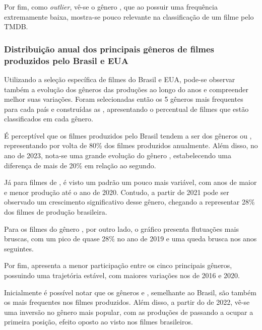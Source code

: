 Por fim, como \textit{outlier}, vê-se o gênero , que ao possuir uma frequência extremamente baixa, mostra-se pouco relevante na classificação de um filme pelo \acrshort{TMDB}.


\subsubsection{Distribuição anual dos principais gêneros de filmes produzidos pelo Brasil e EUA}
Utilizando a seleção específica de filmes do Brasil e EUA, pode-se observar também a evolução dos gêneros das produções ao longo do anos e compreender melhor suas variações. Foram selecionadas então os 5 gêneros mais frequentes para cada país e construídas as , apresentando o percentual de filmes que estão classificados em cada gênero.

%

É perceptível que os filmes produzidos pelo Brasil tendem a ser dos gêneros  ou , representando por volta de 80\% dos filmes produzidos anualmente. Além disso, no ano de 2023, nota-se uma grande evolução do gênero , estabelecendo uma diferença de mais de 20\% em relação ao segundo.

Já para filmes de , é visto um padrão um pouco mais variável, com anos de maior e menor produção até o ano de 2020. Contudo, a partir de 2021 pode ser observado um crescimento significativo desse gênero, chegando a representar 28\% dos filmes de produção brasileira.

Para os filmes do gênero , por outro lado, o gráfico presenta flutuações mais bruscas, com um pico de quase 28\% no ano de 2019 e uma queda brusca nos anos seguintes.

Por fim,  apresenta a menor participação entre os cinco principais gêneros, possuindo uma trajetória estável, com maiores variações nos de 2016 e 2020.

%

Inicialmente é possível notar que os gêneros  e , semelhante ao Brasil, são também os mais frequentes nos filmes produzidos. Além disso, a partir do de 2022, vê-se uma inversão no gênero mais popular, com as produções de  passando a ocupar a primeira posição, efeito oposto ao visto nos filmes brasileiros.


